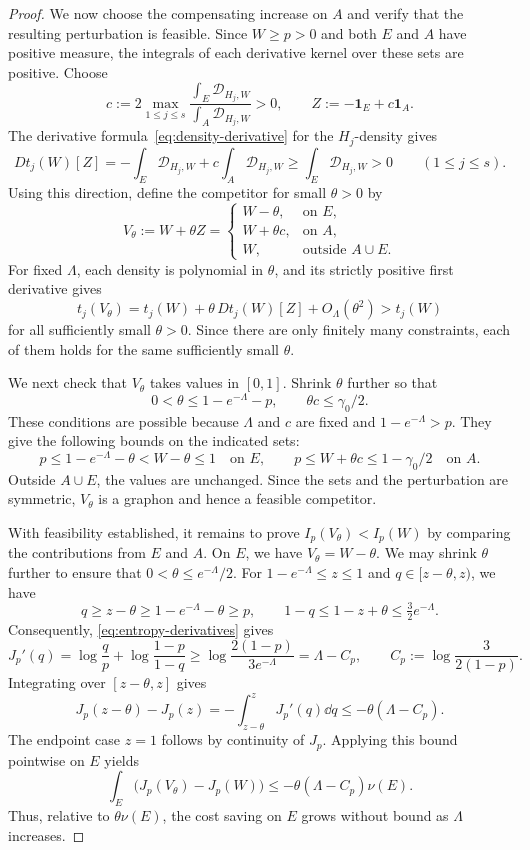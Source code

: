 \begin{proof}
We now choose the compensating increase on $A$ and verify that the
resulting perturbation is feasible.
Since $W\ge p>0$ and both $E$ and $A$ have positive measure, the
integrals of each derivative kernel over these sets are positive.
Choose
\[
  c:=2\max_{1\le j\le s}
       \frac{\int_E\mathcal D_{H_j,W}}{\int_A\mathcal D_{H_j,W}}>0,
  \qquad
  Z:=-\mathbf1_E+c\mathbf1_A.
\]
The derivative formula~\eqref{eq:density-derivative} for the $H_j$-density gives
\[
    Dt_j(W)[Z]
    =-\int_E\mathcal D_{H_j,W}+c\int_A\mathcal D_{H_j,W}
    \ge\int_E\mathcal D_{H_j,W}>0
    \qquad(1\le j\le s).
\]
Using this direction, define the competitor for small $\theta>0$ by
\[
  V_\theta:=W+\theta Z
  =
  \begin{cases}
    W-\theta, & \text{on }E,\\
    W+\theta c, & \text{on }A,\\
    W, & \text{outside }A\cup E.
  \end{cases}
\]
For fixed $\Lambda$, each density is polynomial in $\theta$, and its
strictly positive first derivative gives
\[
  t_j(V_\theta)
  =t_j(W)+\theta\,Dt_j(W)[Z]+O_\Lambda(\theta^2)>t_j(W)
\]
for all sufficiently small $\theta>0$.  Since there are only finitely
many constraints, each of them holds for the same sufficiently small
$\theta$.

We next check that $V_\theta$ takes values in $[0,1]$.  Shrink $\theta$
further so that
\[
  0<\theta\le1-e^{-\Lambda}-p,
  \qquad
  \theta c\le\gamma_0/2.
\]
These conditions are possible because $\Lambda$ and $c$ are fixed
and $1-e^{-\Lambda}>p$.  They give the following bounds
on the indicated sets:
\[
  p\le1-e^{-\Lambda}-\theta<W-\theta\le1\quad\text{on }E,\qquad
  p\le W+\theta c\le1-\gamma_0/2\quad\text{on }A.
\]
Outside $A\cup E$, the values are unchanged.  Since the sets and the
perturbation are symmetric, $V_\theta$ is a graphon and hence a
feasible competitor.

With feasibility established, it remains to prove $I_p(V_\theta)<I_p(W)$
by comparing the contributions from $E$ and $A$. On $E$, we have
$V_\theta=W-\theta$. We may shrink $\theta$ further to ensure that
$0<\theta\le e^{-\Lambda}/2$.  For $1-e^{-\Lambda}\le z\le1$ and $q\in[z-\theta,z)$, we have
\[
  q\ge z-\theta\ge1-e^{-\Lambda}-\theta\ge p,
  \qquad
  1-q\le1-z+\theta\le\tfrac32e^{-\Lambda}.
\]
Consequently, \eqref{eq:entropy-derivatives} gives
\[
    J_p'(q)
    =\log\frac qp+\log\frac{1-p}{1-q}
    \ge\log\frac{2(1-p)}{3e^{-\Lambda}}
    =\Lambda-C_p,
    \qquad C_p:=\log\frac{3}{2(1-p)}.
\]
Integrating over $[z-\theta,z]$ gives
\[
  J_p(z-\theta)-J_p(z)
  =-\int_{z-\theta}^zJ_p'(q)\dd q
  \le-\theta(\Lambda-C_p).
\]
The endpoint case $z=1$ follows by continuity of $J_p$.  Applying this
bound pointwise on $E$ yields
\[
  \int_E\bigl(J_p(V_\theta)-J_p(W)\bigr)
  \le-\theta(\Lambda-C_p)\nu(E).
\]
Thus, relative to $\theta\nu(E)$, the cost saving on $E$ grows without bound
as $\Lambda$ increases.


\end{proof}

